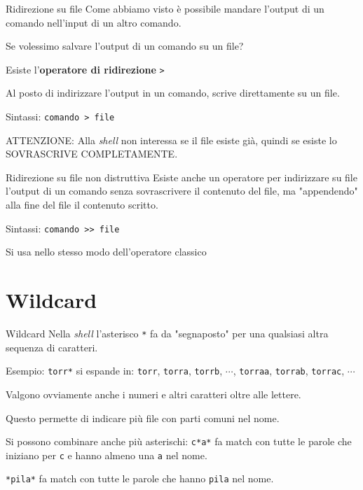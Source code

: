 \documentclass{beamer}
\begin{document}
\begin{frame}{Ridirezione su file}
  Come abbiamo visto è possibile mandare l'output di un comando nell'input di
  un altro comando.\bigskip

  Se volessimo salvare l'output di un comando su un file?\pause

  Esiste l'\textbf{operatore di ridirezione} \texttt{>}\bigskip

  Al posto di indirizzare l'output in un comando, scrive direttamente su un
  file.\bigskip

  Sintassi: \texttt{comando > file}\bigskip

  ATTENZIONE: Alla \textit{shell} non interessa se il file esiste già, quindi se 
  esiste lo SOVRASCRIVE COMPLETAMENTE.
\end{frame}

\begin{frame}{Ridirezione su file non distruttiva}
  Esiste anche un operatore per indirizzare su file l'output di un comando senza 
  sovrascrivere il contenuto del file, ma "appendendo" alla fine del file il
  contenuto scritto.\bigskip

  Sintassi: \texttt{comando >> file}\bigskip

  Si usa nello stesso modo dell'operatore classico\bigskip
\end{frame}


\section{Wildcard}
\begin{frame}{Wildcard}
  Nella \textit{shell} l'asterisco \texttt{*} fa da "segnaposto" per una 
  qualsiasi altra sequenza di caratteri.\bigskip

  Esempio: \texttt{torr*} si espande in: \texttt{torr}, \texttt{torra}, 
  \texttt{torrb}, $\cdots$, \texttt{torraa}, \texttt{torrab}, \texttt{torrac}, 
  $\cdots$\bigskip

  Valgono ovviamente anche i numeri e altri caratteri oltre alle lettere.\bigskip

  Questo permette di indicare più file con parti comuni nel nome.\bigskip

  Si possono combinare anche più asterischi: \texttt{c*a*} fa match con tutte le
  parole che iniziano per \texttt{c} e hanno almeno una \texttt{a} nel 
  nome.\bigskip

  \texttt{*pila*} fa match con tutte le parole che hanno \texttt{pila} nel 
  nome.\bigskip

\end{frame}
\end{document}
